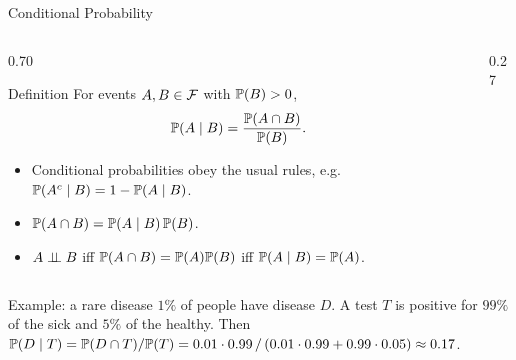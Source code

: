 \begin{frame}{Conditional Probability}
  \small
  \begin{columns}[T]
    \begin{column}{0.70\textwidth}
      \begin{block}{Definition}
        For events $A,B\in\mathcal{F}$ with $\mathbb{P}(B)>0$,
        \[
          \mathbb{P}(A\mid B)=\frac{\mathbb{P}(A\cap B)}{\mathbb{P}(B)} .
        \]
      \end{block}
      \begin{itemize}
        \item Conditional probabilities obey the usual rules, e.g.\ $\mathbb{P}(A^c\mid B)=1-\mathbb{P}(A\mid B)$.
        \item $\mathbb{P}(A\cap B)=\mathbb{P}(A\mid B)\,\mathbb{P}(B)$.
        \item $A\perp\!\!\!\perp B$ iff $\mathbb{P}(A\cap B)=\mathbb{P}(A)\mathbb{P}(B)$ iff $\mathbb{P}(A\mid B)=\mathbb{P}(A)$.
      \end{itemize}
    \end{column}
    \begin{column}{0.27\textwidth}
      \centering
    \end{column}
  \end{columns}
  \begin{block}{Example: a rare disease}
    $1\%$ of people have disease $D$. A test $T$ is positive for $99\%$ of the sick and $5\%$ of the healthy. Then
    $\mathbb{P}(D\mid T)=\mathbb{P}(D\cap T)/\mathbb{P}(T)=0.01\cdot0.99\,/\,(0.01\cdot0.99+0.99\cdot0.05)\approx0.17$.
  \end{block}
\end{frame}

